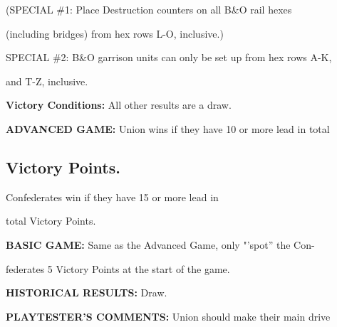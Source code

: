 \begin{scenariodata}
(SPECIAL \#1: Place Destruction counters on all B\&O rail hexes\\
\end{scenariodata}

(including bridges) from hex rows L-O, inclusive.)

\begin{scenariodata}
SPECIAL \#2: B\&O garrison units can only be set up from hex rows A-K,\\
\end{scenariodata}

and T-Z, inclusive.

\begin{scenariodata}
\textbf{Victory Conditions:} All other results are a draw.\\
\end{scenariodata}

\begin{scenariodata}
\textbf{ADVANCED GAME:} Union wins if they have 10 or more lead in total\\
\end{scenariodata}

\subsection*{Victory Points.}

\begin{scenariodata}
Confederates win if they have 15 or more lead in\\
\end{scenariodata}

total Victory Points.

\begin{scenariodata}
\textbf{BASIC GAME:} Same as the Advanced Game, only "'spot'' the Con-\\
\end{scenariodata}

federates 5 Victory Points at the start of the game.

\begin{scenariodata}
\textbf{HISTORICAL RESULTS:} Draw.\\
\end{scenariodata}

\begin{scenariodata}
\textbf{PLAYTESTER'S COMMENTS:} Union should make their main drive\\
\end{scenariodata}


